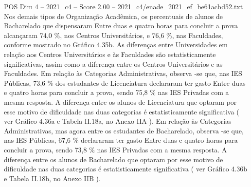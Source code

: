 \begin{textsample}{POS Dim 4 – 2021\_c4 – Score 2.00 – 2021\_c4/enade\_2021\_ef\_be61acbd52.txt}
Nos demais tipos de Organização Acadêmica, os percentuais de alunos de Bacharelado que dispensaram Entre duas e quatro horas para concluir a prova alcançaram 74,0 \%, nos Centros Universitários, e 76,6 \%, nas Faculdades, conforme mostrado no Gráfico 4.35b.
As diferenças entre Universidades em relação aos Centros Universitários e às Faculdades são estatisticamente significativas, assim como a diferença entre os Centros Universitários e as Faculdades.
Em relação às Categorias Administrativas, observa -se que, nas IES Públicas, 73,6 \% dos estudantes de Licenciatura declararam ter gasto Entre duas e quatro horas para concluir a prova, sendo 75,8 \% nas IES Privadas com a mesma resposta.
A diferença entre os alunos de Licenciatura que optaram por esse motivo de dificuldade nas duas categorias é estatisticamente significativa ( ver Gráfico 4.36a e Tabela II.18a, no Anexo IIA ).
Em relação às Categorias Administrativas, mas agora entre os estudantes de Bacharelado, observa -se que, nas IES Públicas, 67,6 \% declararam ter gasto Entre duas e quatro horas para concluir a prova, sendo 73,8 \% nas IES Privadas com a mesma resposta.
A diferença entre os alunos de Bacharelado que optaram por esse motivo de dificuldade nas duas categorias é estatisticamente significativa ( ver Gráfico 4.36b e Tabela II.18b, no Anexo IIB ).

\end{textsample}
